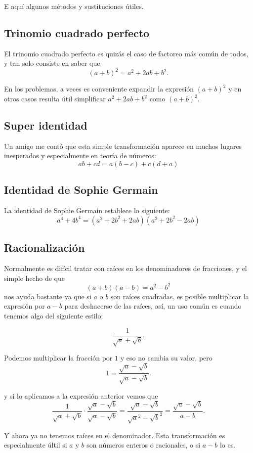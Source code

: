 E aquí algunos métodos y sustituciones
útiles.

\subsection{Trinomio cuadrado perfecto}
El trinomio cuadrado perfecto es quizás
el caso de factoreo más común de todos,
y tan solo consiste en saber que
\[(a + b)^2 = a^2 + 2ab + b^2.\]

En los problemas, a veces es conveniente
expandir la expresión $(a + b)^2$
y en otros casos resulta útil simplificar
$a^2 + 2ab + b^2$ como $(a + b)^2$.

\subsection{Super identidad}
Un amigo me contó que esta simple
transformación aparece en muchos lugares
inesperados y especialmente en teoría de números:
\[ab + cd = a(b - c) + c(d + a)\]

\subsection{Identidad de Sophie Germain}
La identidad de Sophie Germain establece lo siguiente:
\[a^4 + 4b^4 = (a^2 + 2b^2 + 2ab)(a^2 + 2b^2 - 2ab)\]

\subsection{Racionalización}
Normalmente es difícil tratar con raíces en
los denominadores de fracciones,
y el simple hecho de que
\[(a + b)(a - b) = a^2 - b^2\]
nos ayuda bastante ya que si
$a$ o $b$ son raíces cuadradas, es posible
multiplicar la expresión por $a - b$
para deshacerse de las raíces,
así, un uso común es cuando tenemos algo del
siguiente estilo:

\[\frac1{\sqrt a + \sqrt b}.\]

Podemos multiplicar la fracción
por $1$ y eso no cambia su valor,
pero
\[1 = \frac{\sqrt a - \sqrt b}{\sqrt a - \sqrt b}.\]

y si lo aplicamos a la expresión anterior vemos que
\[\frac1{\sqrt a + \sqrt b}\cdot\frac{\sqrt a - \sqrt b}{\sqrt a - \sqrt b} = \frac{\sqrt a - \sqrt b}{\sqrt a ^2 - \sqrt b ^2} = \frac{\sqrt a - \sqrt b}{a - b}.\]

Y ahora ya no tenemos raíces en el denominador.
Esta transformación es especialmente
últil si $a$ y $b$ son números
enteros o racionales, o
si $a - b$ lo es.

